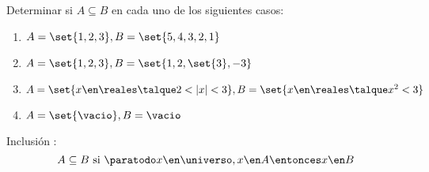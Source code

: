 \begin{enunciado}{\ejercicio}
  Determinar si $A \subseteq B$ en cada uno de los siguientes casos:
  \begin{enumerate}[label=\roman*)]
    \item $ A = \set{1, 2, 3}, B = \set{5,4,3,2,1}$
    \item $ A = \set{1, 2, 3}, B = \set{1,2,\set{3},-3}$
    \item $ A = \set{x \en \reales \talque 2<|x|<3}, B = \set{x \en \reales \talque x^2 < 3 }$
    \item $ A = \set{\vacio}, B = \vacio $
  \end{enumerate}
\end{enunciado}

Inclusión :
$$
  A \subseteq B \text{ si } \paratodo x \en \universo, x \en A \entonces x \en B
$$
